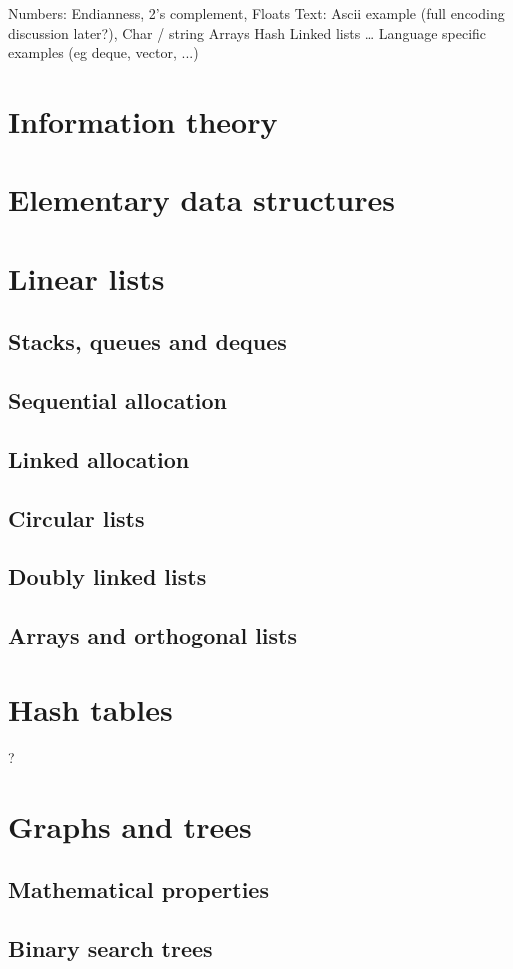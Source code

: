 Numbers: Endianness, 2’s complement, Floats
Text: Ascii example (full encoding discussion later?), Char / string
Arrays
Hash
Linked lists
…
Language specific examples (eg deque, vector, ...)

\section{Information theory}
\section{Elementary data structures}
\section{Linear lists}
\subsection{Stacks, queues and deques}
\subsection{Sequential allocation}
\subsection{Linked allocation}
\subsection{Circular lists}
\subsection{Doubly linked lists}
\subsection{Arrays and orthogonal lists}
\section{Hash tables}
?
\section{Graphs and trees}
\subsection{Mathematical properties}
\subsection{Binary search trees}
